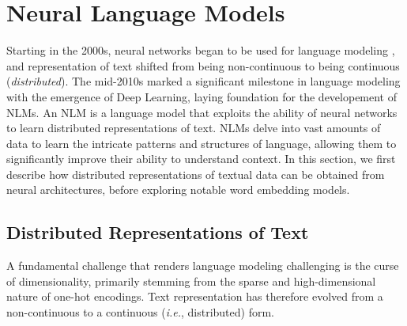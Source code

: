 \section{Neural Language Models}

Starting in the 2000s, neural networks began to be used for language modeling \citep{bengio2000neural}, and representation of text shifted from being non-continuous to being continuous (\textit{distributed}). The mid-2010s marked a significant milestone in language modeling with the emergence of Deep Learning, laying foundation for the developement of \acp{NLM}. An \ac{NLM} is a language model that exploits the ability of neural networks to learn distributed representations of text. \acp{NLM} delve into vast amounts of data to learn the intricate patterns and structures of language, allowing them to significantly improve their ability to understand context. In this section, we first describe how distributed representations of textual data can be obtained from neural architectures, before exploring notable word embedding models.




\subsection{Distributed Representations of Text}

A fundamental challenge that renders language modeling challenging is the curse of dimensionality, primarily stemming from the sparse and high-dimensional nature of one-hot encodings. Text representation has therefore evolved from a non-continuous to a continuous (\textit{i.e.}, distributed) form.

